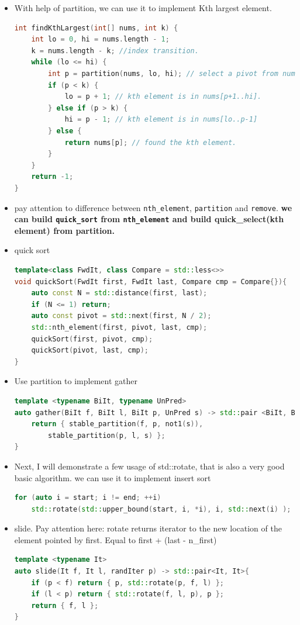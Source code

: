 \documentclass[a4paper,11pt,twoside]{book}
\begin{document}
\begin{itemize}
	\item With help of partition, we can use it to implement Kth largest element. 
\begin{lstlisting}[frame=single, language=c++]	
int findKthLargest(int[] nums, int k) {
	int lo = 0, hi = nums.length - 1;	
	k = nums.length - k; //index transition.
	while (lo <= hi) {
		int p = partition(nums, lo, hi); // select a pivot from nums[lo..hi] 
		if (p < k) {
			lo = p + 1; // kth element is in nums[p+1..hi].
		} else if (p > k) {
			hi = p - 1; // kth element is in nums[lo..p-1]
		} else {
			return nums[p]; // found the kth element.
		}
	}
	return -1;
}
\end{lstlisting}	

	\item pay attention to difference between \texttt{nth\_element}, \texttt{partition} and \texttt{remove}. \textbf{we can build \texttt{quick\_sort} from \texttt{nth\_element} and build quick\_select(kth element) from partition.} 


	\item quick sort
\begin{lstlisting}[frame=single, language=c++]	
template<class FwdIt, class Compare = std::less<>>
void quickSort(FwdIt first, FwdIt last, Compare cmp = Compare{}){
	auto const N = std::distance(first, last);
	if (N <= 1) return; 
	auto const pivot = std::next(first, N / 2);
	std::nth_element(first, pivot, last, cmp);
	quickSort(first, pivot, cmp); 
	quickSort(pivot, last, cmp); 
}	
\end{lstlisting}	

	\item Use partition to implement gather
\begin{lstlisting}[frame=single, language=c++]
template <typename BiIt, typename UnPred> 
auto gather(BiIt f, BiIt l, BiIt p, UnPred s) -> std::pair <BiIt, BiIt>{
	return { stable_partition(f, p, not1(s)), 
		stable_partition(p, l, s) };
}	
\end{lstlisting}
	
	
	\item Next, I will demonstrate a few usage of std::rotate, that is also a very good basic algorithm. we can use it to implement insert sort
\begin{lstlisting}[frame=single, language=c++]	
for (auto i = start; i != end; ++i)
	std::rotate(std::upper_bound(start, i, *i), i, std::next(i) );	
\end{lstlisting}

	\item slide. Pay attention here: rotate returns iterator to the new location of the element pointed by first. Equal to first + (last - n\_first)
\begin{lstlisting}[frame=single, language=c++]
template <typename It> 
auto slide(It f, It l, randIter p) -> std::pair<It, It>{
	if (p < f) return { p, std::rotate(p, f, l) };
	if (l < p) return { std::rotate(f, l, p), p };
	return { f, l };
}
\end{lstlisting}

\end{itemize}
\end{document}
